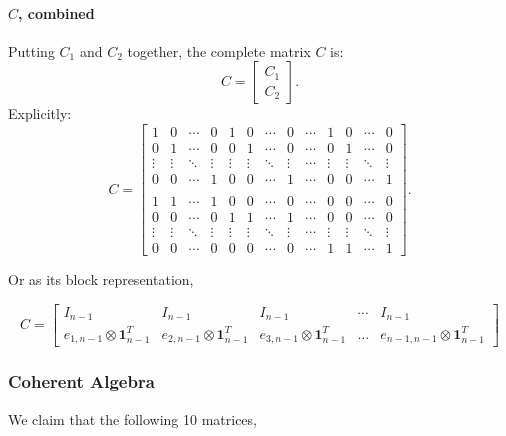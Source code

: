 \paragraph{\texorpdfstring{\( C \), combined}{C, combined}}

Putting \( C_1 \) and \( C_2 \) together, the complete matrix \( C \) is:
\[
C= 
\begin{bmatrix}
C_1 \\ 
C_2
\end{bmatrix}.
\]
Explicitly:
\[
C = 
\begin{bmatrix}
1 & 0 & \cdots & 0 & 1 & 0 & \cdots & 0 & \cdots & 1 & 0 & \cdots & 0 \\
0 & 1 & \cdots & 0 & 0 & 1 & \cdots & 0 & \cdots & 0 & 1 & \cdots & 0 \\
\vdots & \vdots & \ddots & \vdots & \vdots & \vdots & \ddots & \vdots & \cdots & \vdots & \vdots & \ddots & \vdots \\
0 & 0 & \cdots & 1 & 0 & 0 & \cdots & 1 & \cdots & 0 & 0 & \cdots & 1 \\ \\
1 & 1 & \cdots & 1 & 0 & 0 & \cdots & 0 & \cdots & 0 & 0 & \cdots & 0 \\
0 & 0 & \cdots & 0 & 1 & 1 & \cdots & 1 & \cdots & 0 & 0 & \cdots & 0 \\
\vdots & \vdots & \ddots & \vdots & \vdots & \vdots & \ddots & \vdots & \cdots & \vdots & \vdots & \ddots & \vdots \\
0 & 0 & \cdots & 0 & 0 & 0 & \cdots & 0 & \cdots & 1 & 1 & \cdots & 1
\end{bmatrix}.
\]

Or as its block representation,

\[
C =
\begin{bmatrix}
    I_{n-1} & I_{n-1} & I_{n-1} & \cdots & I_{n-1} \\
    e_{1,n-1} \otimes \mathbf{1}_{n-1}^T & e_{2,n-1} \otimes \mathbf{1}_{n-1}^T & e_{3,n-1} \otimes \mathbf{1}_{n-1}^T & \dots & e_{n-1,n-1} \otimes \mathbf{1}_{n-1}^T
\end{bmatrix}
\]

\subsubsection{Coherent Algebra}
We claim that the following 10 matrices,

